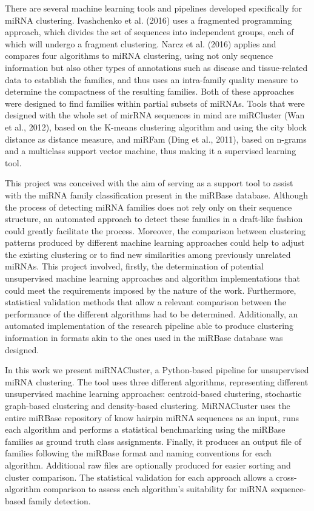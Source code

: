 \documentclass[nocrop]{bioinfo}
\begin{document}
There are several machine learning tools and pipelines developed specifically for miRNA clustering. Ivashchenko et al. (2016) uses a fragmented programming approach, which divides the set of sequences into independent groups, each of which will undergo a fragment clustering. Narcz et al. (2016) applies and compares four algorithms to miRNA clustering, using not only sequence information but also other types of annotations such as disease and tissue-related data to establish the families, and thus uses an intra-family quality measure to determine the compactness of the resulting families. Both of these approaches were designed to find families within partial subsets of miRNAs. Tools that were designed with the whole set of mirRNA sequences in mind are miRCluster (Wan et al., 2012), based on the K-means clustering algorithm and using the city block distance as distance measure, and miRFam (Ding et al., 2011), based on n-grams and a multiclass support vector machine, thus making it a supervised learning tool.

This project was conceived with the aim of serving as a support tool to assist with the miRNA family classification present in the miRBase database. Although the process of detecting miRNA families does not rely only on their sequence structure, an automated approach to detect these families in a draft-like fashion could greatly facilitate the process. Moreover, the comparison between clustering patterns produced by different machine learning approaches could help to adjust the existing clustering or to find new similarities among previously unrelated miRNAs. This project involved, firstly, the determination of potential unsupervised machine learning approaches and algorithm implementations that could meet the requirements imposed by the nature of the work. Furthermore, statistical validation methods that allow a relevant comparison between the performance of the different algorithms had to be determined. Additionally, an automated implementation of the research pipeline able to produce clustering information in formats akin to the ones used in the miRBase database was designed.

In this work we present miRNACluster, a Python-based pipeline for unsupervised miRNA clustering. The tool uses three different algorithms, representing different unsupervised machine learning approaches: centroid-based clustering, stochastic graph-based clustering and density-based clustering. MiRNACluster uses the entire miRBase repository of know hairpin miRNA sequences as an input, runs each algorithm and performs a statistical benchmarking using the miRBase families as ground truth class assignments. Finally, it produces an output file of families following the miRBase format and naming conventions for each algorithm. Additional raw files are optionally produced for easier sorting and cluster comparison. The statistical validation for each approach allows a cross-algorithm comparison to assess each algorithm’s suitability for miRNA sequence-based family detection.
\end{document}
